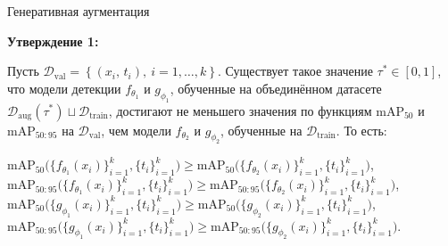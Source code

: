 \documentclass{beamer}
\begin{document}
\begin{frame}{Генеративная аугментация}

\textbf{Утверждение 1:}\par
\small{
Пусть $\mathcal{D}_{\text{val}} =
\left\{
  (x_i,\,t_i), \
  i = 1,\dots,k
\right\}$. Существует такое значение $\tau^*\in[0,1]$, что модели детекции $f_{\theta_1}$ и $g_{\phi_1}$, обученные на объединённом датасете $\mathcal{D}_{\mathrm{aug}}(\tau^*)\sqcup\mathcal{D}_{\mathrm{train}}$, достигают не меньшего значения по функциям $\mathrm{mAP}_{50}$ и $\mathrm{mAP}_{50:95}$ на $\mathcal{D}_{\text{val}}$, чем модели $f_{\theta_2}$ и $g_{\phi_2}$, обученные на $\mathcal{D}_{\text{train}}$. То есть:

\begin{center}
$\mathrm{mAP}_{50}\bigl(\{f_{\theta_1}(x_i)\}_{i=1}^k,\{t_i\}_{i=1}^k\bigr)\ge\mathrm{mAP}_{50}\bigl(\{f_{\theta_2}(x_i)\}_{i=1}^k,\{t_i\}_{i=1}^k\bigr)$,  
$\mathrm{mAP}_{50:95}\bigl(\{f_{\theta_1}(x_i)\}_{i=1}^k,\{t_i\}_{i=1}^k\bigr)\ge\mathrm{mAP}_{50:95}\bigl(\{f_{\theta_2}(x_i)\}_{i=1}^k,\{t_i\}_{i=1}^k\bigr)$,  
$\mathrm{mAP}_{50}\bigl(\{g_{\phi_1}(x_i)\}_{i=1}^k,\{t_i\}_{i=1}^k\bigr)\ge\mathrm{mAP}_{50}\bigl(\{g_{\phi_2}(x_i)\}_{i=1}^k,\{t_i\}_{i=1}^k\bigr)$,  
$\mathrm{mAP}_{50:95}\bigl(\{g_{\phi_1}(x_i)\}_{i=1}^k,\{t_i\}_{i=1}^k\bigr)\ge\mathrm{mAP}_{50:95}\bigl(\{g_{\phi_2}(x_i)\}_{i=1}^k,\{t_i\}_{i=1}^k\bigr)$.
\end{center}}

\end{frame}



\end{document}
